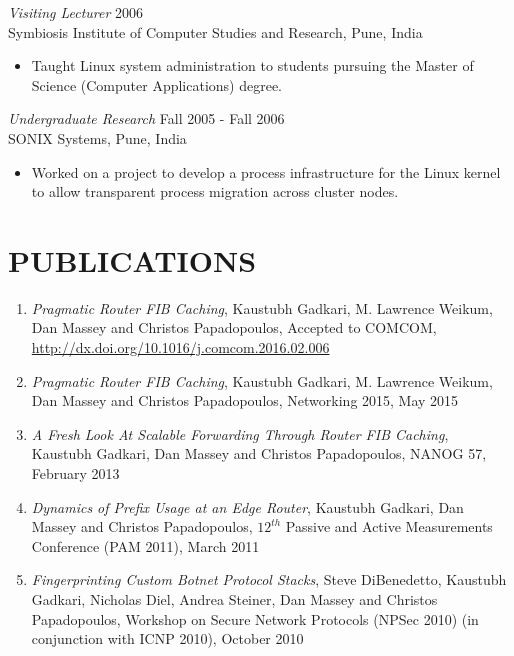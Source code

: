 \documentclass[line,margin]{res}
\begin{document}
\begin{resume}
    {\sl Visiting Lecturer} \hfill 2006\\
        Symbiosis Institute of Computer Studies and Research, Pune, India
        \begin{itemize} \itemsep -2pt
            \item Taught Linux system administration to students pursuing the Master
            of Science (Computer Applications) degree.
        \end{itemize}

    {\sl Undergraduate Research} \hfill Fall 2005 - Fall 2006\\
        SONIX Systems, Pune, India
        \begin{itemize} \itemsep -2pt
            \item Worked on a project to develop a process infrastructure for the Linux kernel to allow
            transparent process migration across cluster nodes.
        \end{itemize}

\section{PUBLICATIONS}
            \begin{enumerate}
              \item {\sl Pragmatic Router FIB Caching}, Kaustubh Gadkari, M. Lawrence Weikum, Dan Massey and
                  Christos Papadopoulos, Accepted to COMCOM, \url{http://dx.doi.org/10.1016/j.comcom.2016.02.006}
              \item {\sl Pragmatic Router FIB Caching}, Kaustubh Gadkari, M. Lawrence Weikum, Dan Massey and
				  Christos Papadopoulos, Networking 2015, May 2015

		  	\item {\sl A Fresh Look At Scalable Forwarding Through Router FIB Caching}, Kaustubh Gadkari, Dan Massey and
              Christos Papadopoulos, NANOG 57, February 2013

              \item {\sl Dynamics of Prefix Usage at an Edge Router}, Kaustubh Gadkari, Dan Massey and Christos Papadopoulos,
              ${12^{th}}$ Passive and Active Measurements Conference (PAM 2011), March 2011

         	  \item {\sl Fingerprinting Custom Botnet Protocol Stacks}, Steve DiBenedetto, Kaustubh Gadkari, Nicholas Diel,
              Andrea Steiner, Dan Massey and Christos Papadopoulos, Workshop on Secure Network Protocols (NPSec 2010)
              (in conjunction with ICNP 2010), October 2010


\end{enumerate}
\end{resume}
\end{document}
